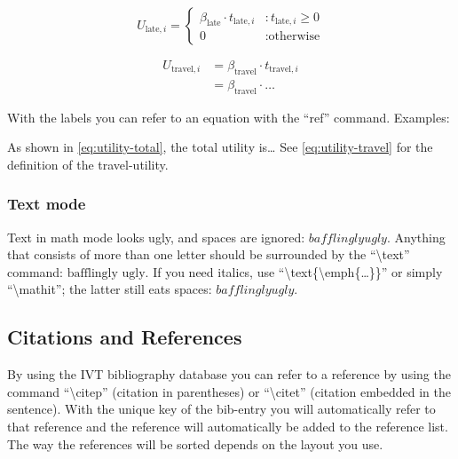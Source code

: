 \begin{equation}\label{eq:utility-late}
  U_{\text{late},i} = \begin{cases} 
    \beta_{\text{late}} \cdot t_{\text{late},i}
      &: t_{\text{late},i} \geq 0 \\
    0
      &: \text{otherwise}
  \end{cases}
\end{equation}

\begin{equation}\label{eq:utility-travel}
  \begin{aligned}
    U_{\text{travel},i} &= \beta_{\text{travel}} \cdot t_{\text{travel},i} \\
                        &= \beta_{\text{travel}} \cdot \ldots
  \end{aligned}
\end{equation}

With the labels you can refer to an equation with the ``ref'' command.
Examples:

As shown in \cref{eq:utility-total}, the total utility is\ldots{}
See \cref{eq:utility-travel} for the definition of the
travel-utility.

\subsubsection{Text mode}

Text in math mode looks ugly, and spaces are ignored:
$bafflingly ugly$.
Anything that consists of more than one letter
should be surrounded by the ``\textbackslash{}text'' command:
$\text{bafflingly ugly}$.
If you need italics, use ``\textbackslash{}text\{\textbackslash{}emph\{\ldots\}\}''
or simply
 ``\textbackslash{}mathit'';
the latter still eats spaces:
$\mathit{bafflingly ugly}$.

\subsection{Citations and References}

By using the IVT bibliography database you can refer to a reference by
using the command ``\textbackslash{}citep'' (citation in parentheses)
or ``\textbackslash{}citet''
(citation embedded in the sentence). With the unique key of the
bib-entry you will automatically refer to that reference and the
reference will automatically be added to the reference list. The way
the references will be sorted depends on the layout you use. 

